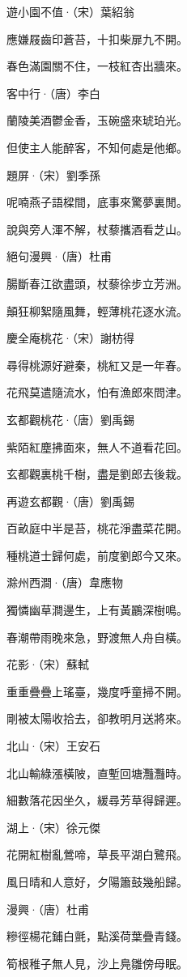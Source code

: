 \documentclass[12pt,a4paper]{ctexbook}
\begin{document}
遊小園不值·（宋）葉紹翁\par
應嫌屐齒印蒼苔，十扣柴扉九不開。\par
春色滿園關不住，一枝紅杏出牆來。\par
客中行·（唐）李白\par
蘭陵美酒鬱金香，玉碗盛來琥珀光。\par
但使主人能醉客，不知何處是他鄉。\par
題屏·（宋）劉季孫\par
呢喃燕子語樑間，底事來驚夢裏閒。\par
說與旁人渾不解，杖藜攜酒看芝山。\par
絕句漫興·（唐）杜甫\par
腸斷春江欲盡頭，杖藜徐步立芳洲。\par
顛狂柳絮隨風舞，輕薄桃花逐水流。\par
慶全庵桃花·（宋）謝枋得\par
尋得桃源好避秦，桃紅又是一年春。\par
花飛莫遣隨流水，怕有漁郎來問津。\par
玄都觀桃花·（唐）劉禹錫\par
紫陌紅塵拂面來，無人不道看花回。\par
玄都觀裏桃千樹，盡是劉郎去後栽。\par
再遊玄都觀·（唐）劉禹錫\par
百畝庭中半是苔，桃花淨盡菜花開。\par
種桃道士歸何處，前度劉郎今又來。\par
滁州西澗·（唐）韋應物\par
獨憐幽草澗邊生，上有黃鸝深樹鳴。\par
春潮帶雨晚來急，野渡無人舟自橫。\par
花影·（宋）蘇軾\par
重重疊疊上瑤臺，幾度呼童掃不開。\par
剛被太陽收拾去，卻教明月送將來。\par
北山·（宋）王安石\par
北山輸綠漲橫陂，直塹回塘灩灩時。\par
細數落花因坐久，緩尋芳草得歸遲。\par
湖上·（宋）徐元傑\par
花開紅樹亂鶯啼，草長平湖白鷺飛。\par
風日晴和人意好，夕陽簫鼓幾船歸。\par
漫興·（唐）杜甫\par
糝徑楊花鋪白氈，點溪荷葉疊青錢。\par
筍根稚子無人見，沙上鳧雛傍母眠。\par
\end{document}
